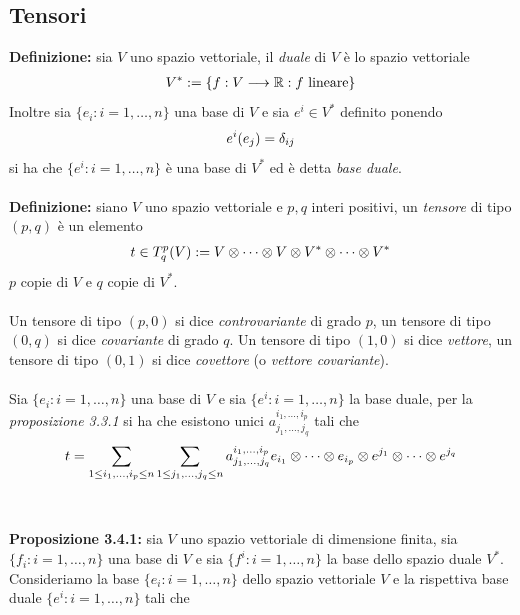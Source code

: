 \documentclass{article}
\begin{document}
\newpage
\subsection{Tensori}
\textbf{Definizione:} sia $V$ uno spazio vettoriale, il \textit{duale} di $V$ è lo spazio vettoriale
\begin{gather}
    V^* := \{ f : V \longrightarrow \mathbb{R} : f \text{ lineare} \} \notag
\end{gather}
Inoltre sia $\{ e_i : i = 1, \dots, n \}$ una base di $V$ e sia $e^i \in V^*$ definito ponendo
\begin{gather}
    e^i(e_j) = \delta_{ij} \notag
\end{gather}
si ha che $\{ e^i : i = 1, \dots, n \}$ è una base di $V^*$ ed è detta \textit{base duale}. \\ \\
\textbf{Definizione:} siano $V$ uno spazio vettoriale e $p, q$ interi positivi, un \textit{tensore} di tipo $(p, q)$ è un elemento
\begin{gather}
    t \in T^p_q(V) := V \otimes \dots \otimes V \otimes V^* \otimes \dots \otimes V^* \notag
\end{gather}
$p$ copie di $V$ e $q$ copie di $V^*$. \\ \\
Un tensore di tipo $(p, 0)$ si dice \textit{controvariante} di grado $p$, un tensore di tipo $(0, q)$ si dice \textit{covariante} di grado $q$. Un tensore di tipo $(1, 0)$ si dice \textit{vettore}, un tensore di tipo $(0, 1)$ si dice \textit{covettore} (o \textit{vettore covariante}). \\ \\ 
Sia $\{ e_i : i = 1, \dots, n \}$ una base di $V$ e sia $\{ e^i : i = 1, \dots, n \}$ la base duale, per la \textit{proposizione 3.3.1} si ha che esistono unici $a^{i_1, \dots, i_p}_{j_1, \dots, j_q}$ tali che
\begin{gather}
    t = \sum_{1 \leq i_1, \dots, i_p \leq n} \sum_{1 \leq j_1, \dots, j_q \leq n} a^{i_1, \dots, i_p}_{j_1, \dots, j_q} e_{i_1} \otimes \dots \otimes e_{i_p} \otimes e^{j_1} \otimes \dots \otimes e^{j_q} \notag
\end{gather} \\ \\
\textbf{Proposizione 3.4.1:} sia $V$ uno spazio vettoriale di dimensione finita, sia $\{ f_i : i = 1, \dots, n \}$ una base di $V$ e sia $\{ f^i : i = 1, \dots, n \}$ la base dello spazio duale $V^*$. Consideriamo la base $\{ e_i : i = 1, \dots, n \}$ dello spazio vettoriale $V$ e la rispettiva base duale $\{ e^i : i = 1, \dots, n \}$ tali che
\end{document}
